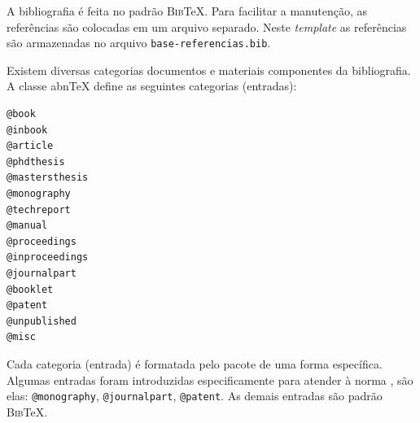 A bibliografia é feita no padrão \textsc{Bib}\TeX{}. Para facilitar a manutenção, as referências são colocadas em um arquivo separado. Neste \textit{template} as referências são armazenadas no arquivo \verb|base-referencias.bib|.

Existem diversas categorias documentos e materiais componentes da bibliografia. A classe abn\TeX{} define as seguintes categorias (entradas):

\begin{verbatim}
@book
@inbook
@article
@phdthesis
@mastersthesis
@monography
@techreport
@manual
@proceedings
@inproceedings
@journalpart
@booklet
@patent
@unpublished
@misc
\end{verbatim}

Cada categoria (entrada) é formatada pelo pacote  de uma forma específica. Algumas entradas foram introduzidas especificamente para atender à norma , são elas: \verb|@monography|, \verb|@journalpart|, \verb|@patent|. As demais entradas são padrão \textsc{Bib}\TeX{}.
